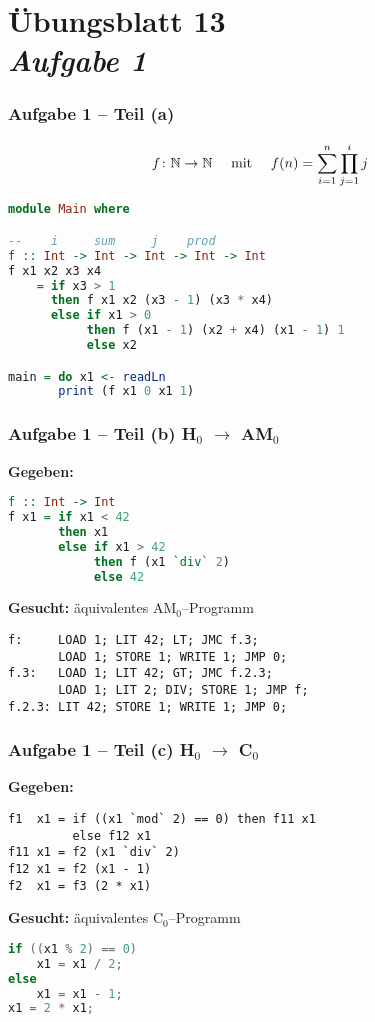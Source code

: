 \documentclass{beamer}
\begin{document}
\section{Übungsblatt 13 \\ \textit{Aufgabe 1}}

\begin{frame}[t, fragile] \frametitle{Aufgabe 1 -- Teil (a)}
	\begin{equation*}
		f \colon \mathbb{N} \to \mathbb{N} \quad \text{ mit } \quad f(n) = \sum_{i=1}^{n} \prod_{j=1}^{i} j
	\end{equation*}
	\pause	
	\begin{lstlisting}[language=Haskell]
module Main where

--    i     sum     j    prod
f :: Int -> Int -> Int -> Int -> Int
f x1 x2 x3 x4
	= if x3 > 1
	  then f x1 x2 (x3 - 1) (x3 * x4)
	  else if x1 > 0
	       then f (x1 - 1) (x2 + x4) (x1 - 1) 1
	       else x2

main = do x1 <- readLn
       print (f x1 0 x1 1)
	\end{lstlisting}
\end{frame}

\begin{frame}[t, fragile] \frametitle{Aufgabe 1 -- Teil (b) \hfill H${}_\text{0}$ $\to$ AM${}_\text{0}$}
	
	\textbf{Gegeben:}
	\begin{lstlisting}[language=Haskell]
f :: Int -> Int
f x1 = if x1 < 42
       then x1
       else if x1 > 42
            then f (x1 `div` 2)
            else 42

	\end{lstlisting}
	
	\textbf{Gesucht:} äquivalentes AM${}_\text{0}$--Programm
	\pause
	\begin{lstlisting}[style=am0, numbers=none]
f:     LOAD 1; LIT 42; LT; JMC f.3;
       LOAD 1; STORE 1; WRITE 1; JMP 0;
f.3:   LOAD 1; LIT 42; GT; JMC f.2.3;
       LOAD 1; LIT 2; DIV; STORE 1; JMP f;
f.2.3: LIT 42; STORE 1; WRITE 1; JMP 0;
	\end{lstlisting}
\end{frame}

\begin{frame}[t, fragile] \frametitle{Aufgabe 1 -- Teil (c) \hfill H${}_\text{0}$ $\to$ C${}_\text{0}$}
	
	\textbf{Gegeben:}
	\begin{lstlisting}
f1  x1 = if ((x1 `mod` 2) == 0) then f11 x1
         else f12 x1
f11 x1 = f2 (x1 `div` 2)
f12 x1 = f2 (x1 - 1)
f2  x1 = f3 (2 * x1)
	\end{lstlisting}
	
	\textbf{Gesucht:} äquivalentes C${}_\text{0}$--Programm
	\pause
	\begin{lstlisting}[language=C]
if ((x1 % 2) == 0)
	x1 = x1 / 2;
else
	x1 = x1 - 1;
x1 = 2 * x1;
	\end{lstlisting}
\end{frame}
\end{document}
